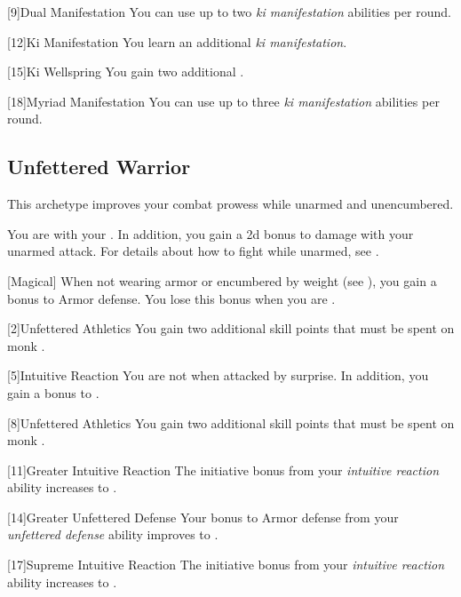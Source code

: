         [9]{Dual Manifestation} You can use up to two \textit{ki manifestation} abilities per round.

        [12]{Ki Manifestation}
        You learn an additional \textit{ki manifestation}.

        [15]{Ki Wellspring} You gain two additional .

        [18]{Myriad Manifestation} You can use up to three \textit{ki manifestation} abilities per round.

    \subsection{Unfettered Warrior}
        This archetype improves your combat prowess while unarmed and unencumbered.

        You are  with your .
        In addition, you gain a \plus2d bonus to damage with your unarmed attack.
        For details about how to fight while unarmed, see .

        [Magical]
        When not wearing armor or encumbered by weight (see ), you gain a  bonus to Armor defense.
        You lose this bonus when you are \helpless.

        [2]{Unfettered Athletics} You gain two additional skill points that must be spent on monk .

        [5]{Intuitive Reaction}
        You are not \unaware when attacked by surprise.
        In addition, you gain a  bonus to .

        [8]{Unfettered Athletics} You gain two additional skill points that must be spent on monk .

        [11]{Greater Intuitive Reaction}
        The initiative bonus from your \textit{intuitive reaction} ability increases to .

        [14]{Greater Unfettered Defense}
        Your bonus to Armor defense from your \textit{unfettered defense} ability improves to .

        [17]{Supreme Intuitive Reaction}
        The initiative bonus from your \textit{intuitive reaction} ability increases to .

